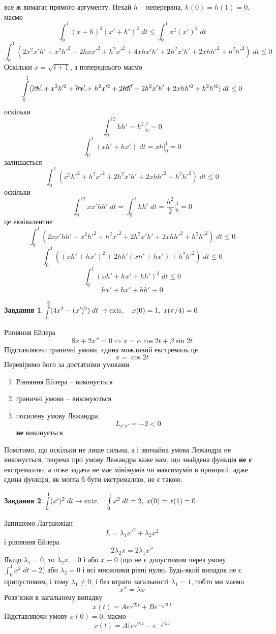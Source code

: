 \documentclass[12pt]{article} %
\newtheorem{prob}{Завдання}
\newcommand{\dt}{\;dt}
\newcommand{\extr}{\mbox{\normalfont extr}}
\begin{document}
	все ж вимагає прямого аргументу. Нехай $h$ -- неперервна, $h(0)=h(1)=0$, маємо
	\[\int_0^1(x+h)^2(x'+h')^2\dt\leq\int_0^1x^2(x')^2\dt\]
	\[\int_0^1(2x^2x'h'+x^2h'^2+2hxx'^2+h^2x'^2+4xhx'h'+2h^2x'h'+2xhh'^2+h^2h'^2)\dt\leq0\]
	Оскільки $x=\sqrt{t+1}$, з попереднього маємо
	\[\int_0^1(\bcancel{xh'}+x^2h'^2+\bcancel{hx'}+h^2x'^2+\cancel{2hh'}+{2h^2x'h'}+2xhh'^2+h^2h'^2)\dt\leq0\]
	оскільки
	\[\int_0^12hh'=h^2\bigg|_0^1=0\]
	\[\int_0^1(xh'+hx')\dt=xh\bigg|_0^1=0\]
	залишається
	\[\int_0^1(x^2h'^2+h^2x'^2+{2h^2x'h'}+2xhh'^2+h^2h'^2)\dt\leq0\]
	оскільки 
	\[\int_0^12xx'hh'\dt=\int_0^1hh'\dt=\frac{h^2}{2}\bigg|_0^1=0\]
	це еквівалентне
	\[\int_0^1(2xx'hh'+x^2h'^2+h^2x'^2+{2h^2x'h'}+2xhh'^2+h^2h'^2)\dt\leq0\]
	\[\int_0^1((xh'+hx')^2+2hh'(xh'+hx')+h^2h'^2)\dt\leq0\]
	\[\int_0^1(xh'+hx'+hh')^2\dt\leq0\]
	\[hx'+hx'+hh'\equiv0\]
\begin{prob}{}\; $\int_0^{\frac{\pi}{4}}(4x^2-(x')^2)\dt\to\extr,\quad x(0)=1,\;x(\pi/4)=0$\end{prob}
	Рівняння Ейлера
	\[8x+2x''=0\iff x=\alpha\cos2t+\beta\sin2t\]
	Підставляючи граничні умови, єдина можливий екстремаль це
	\[x=\cos2t\]
	Перевіримо його за достатніми умовами
	\begin{enumerate}
		\item Рівняння Ейлера -- виконується
		\item граничні умови -- виконуються
		\item посилену умову Лежандра.
			\[L_{x'x'}=-2<0\]
			\textbf{не} виконується
	\end{enumerate}
	Помітимо, що оскільки не лише сильна, а і звичайна умова Лежандра не виконується, теорема про умову Лежандра каже нам,
	що знайдена функція \textbf{не є} екстремаллю, а отже задача не має мінімумів чи максимумів в принципі, адже єдина функція, як могла б бути
	екстремаллю, не є такою.
\begin{prob}{}\; $\int_0^1(x')^2\dt\to\extr,\quad\int_0^1x^2\dt=2,\;x(0)=x(1)=0$\end{prob}
	Запишемо Лагранжіан
	\[L=\lambda_1x'^2+\lambda_2x^2\]
	і рівняння Ейлера
	\[2\lambda_2x=2\lambda_1x''\]
	Якщо $\lambda_1=0$, то $\lambda_2x=0$ і або $x\equiv0$ (що не є допустимим через умову $\int_0^1x^2\dt=2$)
	або $\lambda_2=0$ і всі множники рівні нулю. Будь-який випадок не є припустимим, і тому $\lambda_1\neq0$,
	і без втрати загальності $\lambda_1=1$, тобто ми маємо
	\[x''=\lambda x\]
	Розв’язки в загальному випадку
	\[x(t)=Ae^{\sqrt{\lambda}t}+Be^{-\sqrt{\lambda}t}\]
	Підставляючи умову $x(0)=0$, маємо
	\[x(t)=A(e^{\sqrt{\lambda}t}-e^{-\sqrt{\lambda}t}\]
\end{document}
